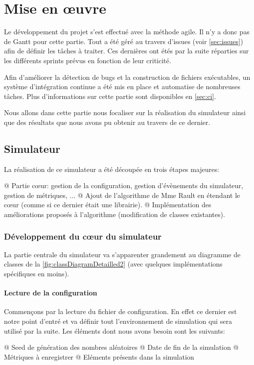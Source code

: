 \documentclass[final]{polytech/polytech}
\begin{document}
	
\chapter{Mise en \oe uvre}
	Le développement du projet s'est effectué avec la méthode agile.
	Il n'y a donc pas de Gantt pour cette partie.
	Tout a été géré au travers d'issues (voir \autoref{sec:issues}) afin de définir les tâches à traiter.
	Ces dernières ont étés par la suite réparties sur les différents sprints prévus en fonction de leur criticité.
	
	Afin d'améliorer la détection de bugs et la construction de fichiers exécutables, un système d'intégration continue a été mis en place et automatise de nombreuses tâches.
	Plus d'informations sur cette partie sont disponibles en \autoref{sec:ci}.
	
	Nous allons dans cette partie nous focaliser sur la réalisation du simulateur ainsi que des résultats que nous avons pu obtenir au travers de ce dernier. 
	
	\section{Simulateur}
		La réalisation de ce simulateur a été découpée en trois étapes majeures:
		\begin{easylist}
			@ Partie c\oe ur: gestion de la configuration, gestion d'évènements du simulateur, gestion de métriques, ...
			@ Ajout de l'algorithme de Mme Rault en étendant le c\oe ur (comme si ce dernier était une librairie).
			@ Implémentation des améliorations proposés à l'algorithme (modification de classes existantes).
		\end{easylist}
		
		\subsection{Développement du c\oe ur du simulateur}
			La partie centrale du simulateur va s'apparenter grandement au diagramme de classes de la \autoref{fig:classDiagramDetailled2} (avec quelques implémentations spécifiques en moins).
			
			\subsubsection{Lecture de la configuration}
				Commençons par la lecture du fichier de configuration.
				En effet ce dernier est notre point d'entré et va définir tout l'environnement de simulation qui sera utilisé par la suite.
				Les éléments dont nous avons besoin sont les suivants:
				\begin{easylist}
					@ Seed de génération des nombres aléatoires
					@ Date de fin de la simulation
					@ Métriques à enregistrer
					@ Eléments présents dans la simulation
				\end{easylist}
				
\end{document}
